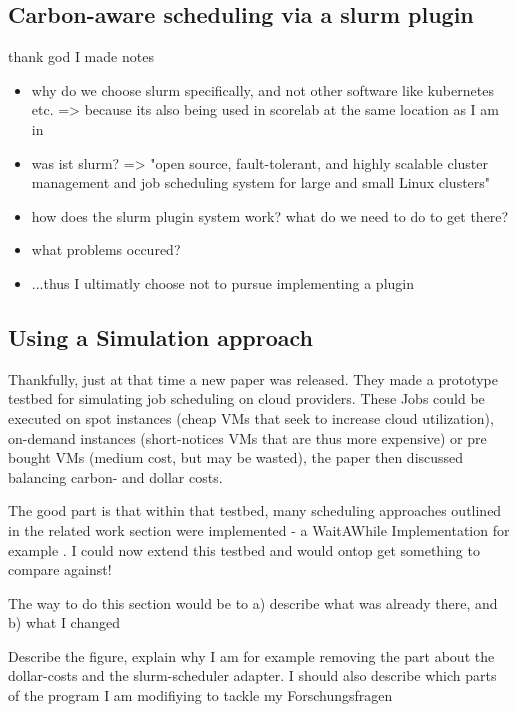 \subsection{Carbon-aware scheduling via a slurm plugin}
\label{subsec:slurm_plugin}

thank god I made notes

\begin{itemize}
    \item why do we choose slurm specifically, and not other software like kubernetes etc. => because its also being used in scorelab at the same location as I am in
    \item was ist slurm? => "open source, fault-tolerant, and highly scalable cluster management and job scheduling system for large and small Linux clusters"
    \item how does the slurm plugin system work? what do we need to do to get there?
    \item what problems occured?
    \item ...thus I ultimatly choose not to pursue implementing a plugin
\end{itemize}

\subsection{Using a Simulation approach}

Thankfully, just at that time a new paper \cite{hanafy_going_2024} was released. 
They made a prototype testbed for simulating job scheduling on cloud providers. These Jobs could be executed on spot instances (cheap VMs that seek to increase cloud utilization), on-demand instances (short-notices VMs that are thus more expensive) or pre bought VMs (medium cost, but may be wasted), the paper then discussed balancing carbon- and dollar costs.

The good part is that within that testbed, many scheduling approaches outlined in the related work section were implemented - a WaitAWhile Implementation for example . I could now extend this testbed and would ontop get something to compare against!

The way to do this section would be to a) describe what was already there, and b) what I changed


Describe the figure, explain why I am for example removing the part about the dollar-costs and the slurm-scheduler adapter. I should also describe which parts of the program I am modifiying to tackle my Forschungsfragen


